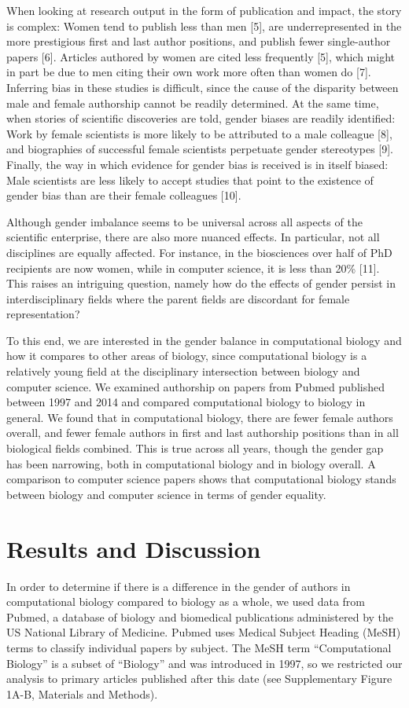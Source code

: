 \documentclass[10pt,letterpaper]{article}
\begin{document}
\begin{flushleft}
When looking at research output in the form of publication and impact, the story is complex: Women tend to publish less than men [5], are underrepresented in the more prestigious first and last author positions, and publish fewer single-author papers [6]. Articles authored by women are cited less frequently [5], which might in part be due to men citing their own work more often than women do [7]. Inferring bias in these studies is difficult, since the cause of the disparity between male and female authorship cannot be readily determined. At the same time, when stories of scientific discoveries are told, gender biases are readily identified: Work by female scientists is more likely to be attributed to a male colleague [8], and biographies of successful female scientists perpetuate gender stereotypes [9]. Finally, the way in which evidence for gender bias is received is in itself biased:  Male scientists are less likely to accept studies that point to the existence of gender bias than are their female colleagues [10].

Although gender imbalance seems to be universal across all aspects of the scientific enterprise, there are also more nuanced effects. In particular, not all disciplines are equally affected. For instance, in the biosciences over half of PhD recipients are now women, while in computer science, it is less than 20\% [11]. This raises an intriguing question, namely how do the effects of gender persist in interdisciplinary fields where the parent fields are discordant for female representation?

To this end, we are interested in the gender balance in computational biology and how it compares to other areas of biology, since computational biology is a relatively young field at the disciplinary intersection between biology and computer science. We examined authorship on papers from Pubmed published between 1997 and 2014 and compared computational biology to biology in general. We found that in computational biology, there are fewer female authors overall, and fewer female authors in first and last authorship positions than in all biological fields combined. This is true across all years, though the gender gap has been narrowing, both in computational biology and in biology overall. A comparison to computer science papers shows that computational biology stands between biology and computer science in terms of gender equality.

\section*{Results and Discussion}
In order to determine if there is a difference in the gender of authors in computational biology compared to biology as a whole, we used data from Pubmed, a database of biology and biomedical publications administered by the US National Library of Medicine. Pubmed uses Medical Subject Heading (MeSH) terms to classify individual papers by subject. The MeSH term “Computational Biology” is a subset of “Biology” and was introduced in 1997, so we restricted our analysis to primary articles published after this date (see Supplementary Figure 1A-B, Materials and Methods).


\end{flushleft}
\end{document}
